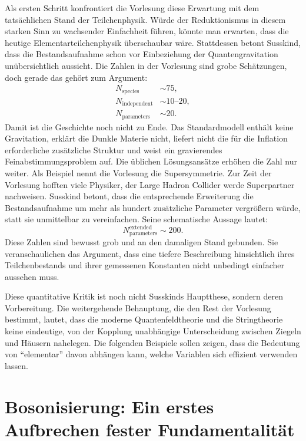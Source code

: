 Als ersten Schritt konfrontiert die Vorlesung diese Erwartung mit dem tatsächlichen Stand der Teilchenphysik. Würde der Reduktionismus in diesem starken Sinn zu wachsender Einfachheit führen, könnte man erwarten, dass die heutige Elementarteilchenphysik überschaubar wäre. Stattdessen betont Susskind, dass die Bestandsaufnahme schon vor Einbeziehung der Quantengravitation unübersichtlich aussieht. Die Zahlen in der Vorlesung sind grobe Schätzungen, doch gerade das gehört zum Argument:
\begin{equation}
\begin{aligned}
N_{\mathrm{species}}&\sim 75,\\
N_{\mathrm{independent}}&\sim 10\text{--}20,\\
N_{\mathrm{parameters}}&\sim 20.
\end{aligned}
\end{equation}
Damit ist die Geschichte noch nicht zu Ende. Das Standardmodell enthält keine Gravitation, erklärt die Dunkle Materie nicht, liefert nicht die für die Inflation erforderliche zusätzliche Struktur und weist ein gravierendes Feinabstimmungsproblem auf. Die üblichen Lösungsansätze erhöhen die Zahl nur weiter. Als Beispiel nennt die Vorlesung die Supersymmetrie. Zur Zeit der Vorlesung hofften viele Physiker, der Large Hadron Collider werde Superpartner nachweisen. Susskind betont, dass die entsprechende Erweiterung die Bestandsaufnahme um mehr als hundert zusätzliche Parameter vergrößern würde, statt sie unmittelbar zu vereinfachen. Seine schematische Aussage lautet:
\begin{equation}
N_{\mathrm{parameters}}^{\mathrm{extended}} \sim 200.
\end{equation}
Diese Zahlen sind bewusst grob und an den damaligen Stand gebunden. Sie veranschaulichen das Argument, dass eine tiefere Beschreibung hinsichtlich ihres Teilchenbestands und ihrer gemessenen Konstanten nicht unbedingt einfacher aussehen muss.

Diese quantitative Kritik ist noch nicht Susskinds Hauptthese, sondern deren Vorbereitung. Die weitergehende Behauptung, die den Rest der Vorlesung bestimmt, lautet, dass die moderne Quantenfeldtheorie und die Stringtheorie keine eindeutige, von der Kopplung unabhängige Unterscheidung zwischen Ziegeln und Häusern nahelegen. Die folgenden Beispiele sollen zeigen, dass die Bedeutung von ``elementar'' davon abhängen kann, welche Variablen sich effizient verwenden lassen.

\section{Bosonisierung: Ein erstes Aufbrechen fester Fundamentalität}

